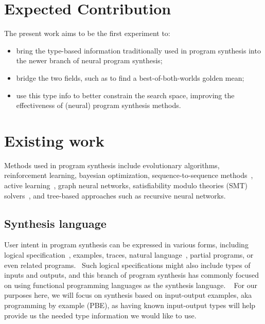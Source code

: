 \documentclass{article}
\begin{document}
\section{Expected Contribution}\label{sec:expected-contribution}

The present work aims to be the first experiment to:
\begin{itemize}
    \item bring the type-based information traditionally used in program synthesis into the newer branch of neural program synthesis;
    \item bridge the two fields, such as to find a best-of-both-worlds golden mean;
    \item use this type info to better constrain the search space, improving the effectiveness of (neural) program synthesis methods. 
\end{itemize}

\section{Existing work}\label{sec:existing-work}



Methods used in program synthesis include evolutionary algorithms, reinforcement learning, bayesian optimization, sequence-to-sequence methods~\citep{neuralmachinetranslation}, active learning~\citep{shen2019using}, graph neural networks, satisfiability modulo theories (SMT) solvers~\citep{rosette,hornclauses,architecture}, and tree-based approaches such as recursive neural networks.


\subsection{Synthesis language}

User intent in program synthesis can be expressed in various forms, including logical specification~\citep{temporalstreamlogic},
examples, traces, natural language~\citep{abstractsyntaxnetworks}, partial programs, or even related programs.~\citep{gulwani2017program}
Such logical specifications might also include types of inputs and outputs,
and this branch of program synthesis has commonly focused on using functional programming languages as the synthesis language.%
~\citep{synquid,eguchi2018automated,scythe,scout,gissurarson2018suggesting,idris,lenses}
For our purposes here, we will focus on synthesis based on input-output examples, aka programming by example (PBE),
as having known input-output types will help provide us the needed type information we would like to use.
\end{document}

